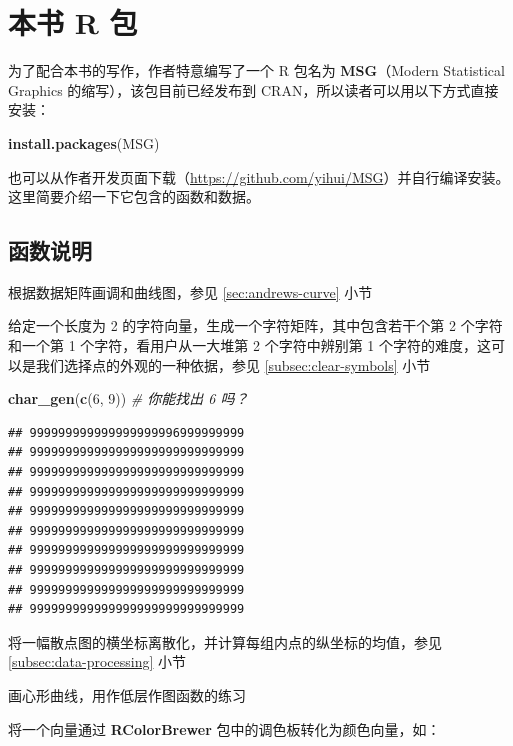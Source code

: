 \documentclass[
  b5paper,
  UTF8,twoside]{book}
\newenvironment{Shaded}{\begin{snugshade}}{\end{snugshade}}
\newcommand{\CommentTok}[1]{\textcolor[rgb]{0.56,0.35,0.01}{\textit{#1}}}
\newcommand{\FunctionTok}[1]{\textcolor[rgb]{0.13,0.29,0.53}{\textbf{#1}}}
\newcommand{\NormalTok}[1]{#1}
\newcommand{\StringTok}[1]{\textcolor[rgb]{0.31,0.60,0.02}{#1}}
\providecommand{\tightlist}{%
  \setlength{\itemsep}{0pt}\setlength{\parskip}{0pt}}
\begin{document}
\chapter{本书 R 包}\label{chap:MSG}

为了配合本书的写作，作者特意编写了一个 R 包名为 \textbf{MSG}（Modern Statistical Graphics 的缩写），该包目前已经发布到 CRAN，所以读者可以用以下方式直接安装：

\begin{Shaded}
\begin{Highlighting}[]
\FunctionTok{install.packages}\NormalTok{(}\StringTok{\textquotesingle{}MSG\textquotesingle{}}\NormalTok{)}
\end{Highlighting}
\end{Shaded}

也可以从作者开发页面下载（\url{https://github.com/yihui/MSG}）并自行编译安装。这里简要介绍一下它包含的函数和数据。

\section{函数说明}\label{sec:MSG-fun}

\begin{description}
\tightlist
\item[\texttt{andrews\_curve()}]
根据数据矩阵画调和曲线图，参见 \ref{sec:andrews-curve} 小节
\item[\texttt{char\_gen()}]
给定一个长度为 2 的字符向量，生成一个字符矩阵，其中包含若干个第 2 个字符和一个第 1 个字符，看用户从一大堆第 2 个字符中辨别第 1 个字符的难度，这可以是我们选择点的外观的一种依据，参见 \ref{subsec:clear-symbols} 小节

\begin{Shaded}
\begin{Highlighting}[]
\FunctionTok{char\_gen}\NormalTok{(}\FunctionTok{c}\NormalTok{(}\StringTok{\textquotesingle{}6\textquotesingle{}}\NormalTok{, }\StringTok{\textquotesingle{}9\textquotesingle{}}\NormalTok{))  }\CommentTok{\# 你能找出 6 吗？}
\end{Highlighting}
\end{Shaded}

\begin{verbatim}
## 999999999999999999996999999999
## 999999999999999999999999999999
## 999999999999999999999999999999
## 999999999999999999999999999999
## 999999999999999999999999999999
## 999999999999999999999999999999
## 999999999999999999999999999999
## 999999999999999999999999999999
## 999999999999999999999999999999
## 999999999999999999999999999999
\end{verbatim}
\item[\texttt{cut\_plot()}]
将一幅散点图的横坐标离散化，并计算每组内点的纵坐标的均值，参见 \ref{subsec:data-processing} 小节
\item[\texttt{heart\_curve()}]
画心形曲线，用作低层作图函数的练习
\item[\texttt{vec2col()}]
将一个向量通过 \textbf{RColorBrewer} 包中的调色板转化为颜色向量，如：
\end{description}
\end{document}
